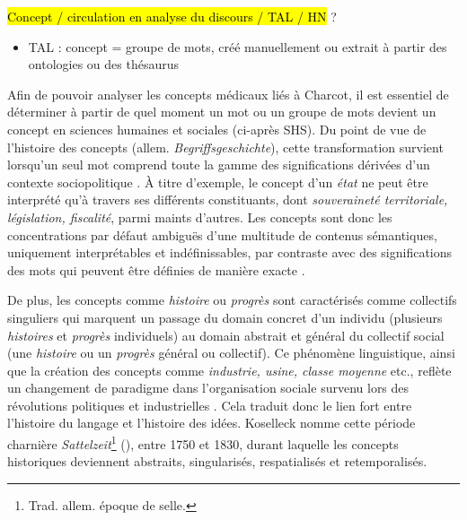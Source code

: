  \hl{Concept / circulation en analyse du discours / TAL / HN} ?  
\begin{itemize}
\item TAL : concept = groupe de mots, créé manuellement ou extrait à partir des ontologies ou des thésaurus
\end{itemize}



Afin de pouvoir analyser les concepts médicaux liés à Charcot, il est essentiel de déterminer à partir de quel moment un mot ou un groupe de mots devient un concept en sciences humaines et sociales (ci-après SHS). Du point de vue de l'histoire des concepts (allem. \textit{Begriffsgeschichte}), cette transformation survient lorsqu'un seul mot comprend toute la gamme des significations dérivées d'un contexte sociopolitique \citep[p. 258]{koselleck2011introduction}. À titre d'exemple, le concept d'un \textit{état} ne peut être interprété qu'à travers ses différents constituants, dont \textit{souveraineté territoriale, législation, fiscalité}, parmi maints d'autres. Les concepts sont donc les concentrations par défaut ambiguës d'une multitude de contenus sémantiques, uniquement interprétables et indéfinissables, par contraste avec des significations des mots qui peuvent être définies de manière exacte \citep[p. 20]{koselleck2011introduction}. 

De plus, les concepts comme \textit{histoire} ou \textit{progrès} sont caractérisés comme \og{}collectifs singuliers\fg{} qui marquent un passage du domain concret d'un individu (plusieurs \textit{histoires} et \textit{progrès} individuels) au domain abstrait et général du collectif social (une \textit{histoire} ou un \textit{progrès} général ou collectif).  Ce phénomène linguistique, ainsi que la création des concepts comme \textit{industrie, usine, classe moyenne} etc., reflète un changement de paradigme dans l'organisation sociale survenu lors des révolutions politiques et industrielles \citep[p. 1]{hobsbawm2010age}. Cela traduit donc le lien fort entre l'histoire du langage et l'histoire des idées. Koselleck nomme cette période charnière \textit{Sattelzeit}\footnote{Trad. allem. \og{}époque de selle\fg{}.} (\citeyear[p. 8]{koselleck2011introduction}), entre 1750 et 1830, durant laquelle les concepts historiques deviennent abstraits, singularisés, respatialisés et retemporalisés.
 
